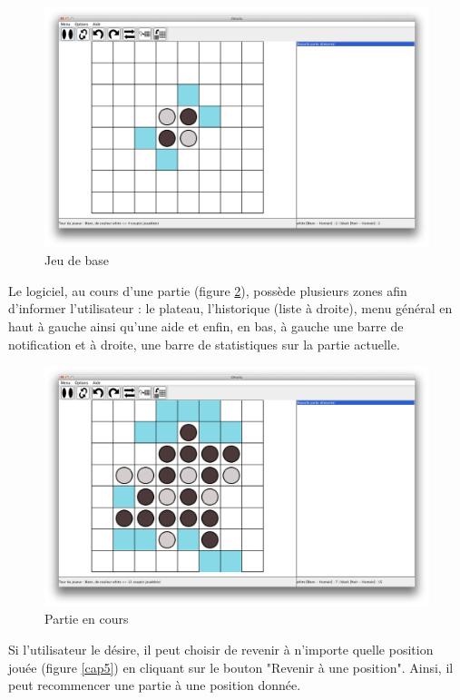 \documentclass[a4paper,12pt]{report}
\begin{document}
\begin{figure}[H]
\centering
\includegraphics[scale=0.2]{Images/debut.png}
\caption{Jeu de base}
\label{cap3}
\end{figure}

Le logiciel, au cours d'une partie (figure \ref{cap4}), possède plusieurs zones afin d'informer l'utilisateur : le plateau, l'historique (liste à droite), menu général en haut à gauche ainsi qu'une aide et enfin, en bas, à gauche une barre de notification et à droite, une barre de statistiques sur la partie actuelle.

\begin{figure}[H]
\centering
\includegraphics[scale=0.2]{Images/cours.png}
\caption{Partie en cours}
\label{cap4}
\end{figure}

Si l'utilisateur le désire, il peut choisir de revenir à n'importe quelle position jouée (figure \ref{cap5}) en cliquant sur le bouton "Revenir à une position". Ainsi, il peut recommencer une partie à une position donnée. 
\end{document}
